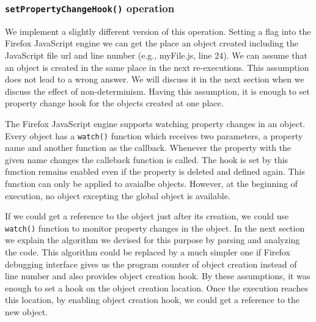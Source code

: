 \documentclass[preprint]{sigplanconf}
\begin{document}
\subsubsection{\texttt{setPropertyChangeHook()} operation}
We implement a slightly different version of this operation. Setting a
flag into the Firefox JavaScript engine we can get the place an object
created including the JavaScript file url and line number (e.g.,
myFile.js, line 24). We can assume that an object is created in the
same place in the next re-executions. This assumption does not lead to
a wrong answer. We will discuss it in the next section when we discuss
the effect of non-determinism. Having this assumption, it is enough to
set property change hook for the objects created at one place.

The Firefox JavaScript engine supports watching property changes in an
object. Every object has a \texttt{watch()} function which receives
two parameters, a property name and another function as the
callback. Whenever the property with the given name changes the
calleback function is called. The hook is set by this function remains
enabled even if the property is deleted and defined again. This
function can only be applied to avaialbe objects. However, at the
beginning of execution, no object excepting the global object is
available.

If we could get a reference to the object just after its creation, we
could use \texttt{watch()} function to monitor property changes in the
object. In the next section we explain the algorithm we devised for
this purpose by parsing and analyzing the code. This algorithm could
be replaced by a much simpler one if Firefox debugging interface gives
us the program counter of object creation instead of line number and
also provides object creation hook.  By these assumptions, it was
enough to set a hook on the object creation location. Once the
execution reaches this location, by enabling object creation hook, we
could get a reference to the new object.

 
\end{document}
